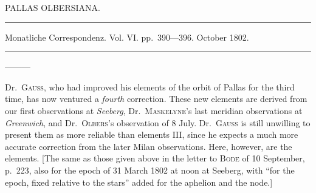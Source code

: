 %
\bigskip{}
\begin{center}
PALLAS OLBERSIANA.\par
\medskip\hrule\medskip
Monatliche Correspondenz. Vol. VI. pp.\ 390—396. October 1802.\par
\medskip\hrule
\end{center}\medskip
—\quad —\quad —

Dr.\ \textsc{Gauss}, who had improved his elements of the orbit of Pallas for the third time, has now ventured a \textit{fourth} correction. These new elements are derived from our first observations at \textit{Seeberg}, Dr.\ \textsc{Maskelyne}’s last meridian observations at \textit{Greenwich}, and Dr.\ \textsc{Olbers}’s observation of 8 July. Dr.\ \textsc{Gauss} is still unwilling to present them as more reliable than elements III, since he expects a much more accurate correction from the later Milan observations. Here, however, are the elements. [The same as those given above in the letter to \textsc{Bode} of 10 September, p.\ 223, also for the epoch of 31 March 1802 at noon at Seeberg, with “for the epoch, fixed relative to the stars” added for the aphelion and the node.]

